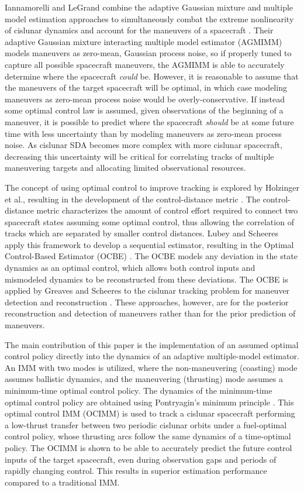 \documentclass[letterpaper, preprint, paper,11pt]{AAS}	%
\begin{document}
Iannamorelli and LeGrand combine the adaptive Gaussian mixture and multiple model estimation approaches to simultaneously combat the extreme nonlinearity of cislunar dynamics and account for the maneuvers of a spacecraft \cite{iannamorelli2025adaptive}. Their adaptive Gaussian mixture interacting multiple model estimator (AGMIMM) models maneuvers as zero-mean, Gaussian process noise, so if properly tuned to capture all possible spacecraft maneuvers, the AGMIMM is able to accurately determine where the spacecraft \textit{could} be. However, it is reasonable to assume that the maneuvers of the target spacecraft will be optimal, in which case modeling maneuvers as zero-mean process noise would be overly-conservative. If instead some optimal control law is assumed, given observations of the beginning of a maneuver, it is possible to predict where the spacecraft \textit{should} be at some future time with less uncertainty than by modeling maneuvers as zero-mean process noise. As cislunar SDA becomes more complex with more cislunar spacecraft, decreasing this uncertainty will be critical for correlating tracks of multiple maneuvering targets and allocating limited observational resources.

The concept of using optimal control to improve tracking is explored by Holzinger et al., resulting in the development of the control-distance metric \cite{holzinger2012object}. The control-distance metric characterizes the amount of control effort required to connect two spacecraft states assuming some optimal control, thus allowing the correlation of tracks which are separated by smaller control distances. Lubey and Scheeres apply this framework to develop a sequential estimator, resulting in the Optimal Control-Based Estimator (OCBE) \cite{lubey2013optimal}. The OCBE models any deviation in the state dynamics as an optimal control, which allows both control inputs and mismodeled dynamics to be reconstructed from these deviations. The OCBE is applied by Greaves and Scheeres to the cislunar tracking problem for maneuver detection and reconstruction \cite{greaves2021observation}. These approaches, however, are for the posterior reconstruction and detection of maneuvers rather than for the prior prediction of maneuvers. 

The main contribution of this paper is the implementation of an assumed optimal control policy directly into the dynamics of an adaptive multiple-model estimator. An IMM with two modes is utilized, where the non-maneuvering (coasting) mode assumes ballistic dynamics, and the maneuvering (thrusting) mode assumes a minimum-time optimal control policy. The dynamics of the minimum-time optimal control policy are obtained using Pontryagin's minimum principle \cite{pontryagin1962}. This optimal control IMM (OCIMM) is used to track a cislunar spacecraft performing a low-thrust transfer between two periodic cislunar orbits under a fuel-optimal control policy, whose thrusting arcs follow the same dynamics of a time-optimal policy. The OCIMM is shown to be able to accurately predict the future control inputs of the target spacecraft, even during observation gaps and periods of rapidly changing control. This results in superior estimation performance compared to a traditional IMM. 
\end{document}
